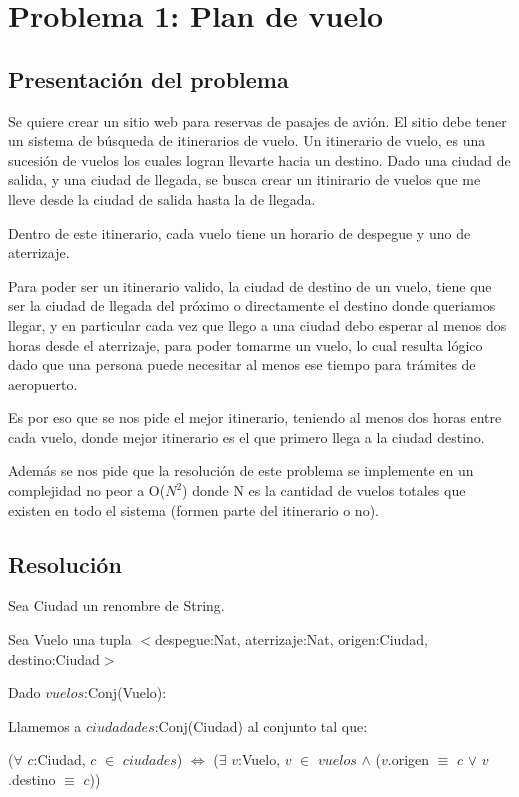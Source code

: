 \section{Problema 1: Plan de vuelo}

\subsection{Presentación del problema}

Se quiere crear un sitio web para reservas de pasajes de avi\'on. El sitio debe tener un sistema de b\'usqueda de itinerarios de vuelo. Un itinerario de vuelo, es una sucesi\'on de vuelos los cuales logran llevarte hacia un destino. Dado una ciudad de salida, y una ciudad de llegada, se busca crear un itinirario de vuelos que me lleve desde la ciudad de salida hasta la de llegada.

Dentro de este itinerario, cada vuelo tiene un horario de despegue y uno de aterrizaje. 

Para poder ser un itinerario valido, la ciudad de destino de un vuelo, tiene que ser la ciudad de llegada del pr\'oximo o directamente el destino donde queriamos llegar, y en particular cada vez que llego a una ciudad debo esperar al menos dos horas desde el aterrizaje, para poder tomarme un vuelo, lo cual resulta l\'ogico dado que una persona puede necesitar al menos ese tiempo para tr\'amites de aeropuerto.

Es por eso que se nos pide el mejor itinerario, teniendo al menos dos horas entre cada vuelo, donde mejor itinerario es el que primero llega a la ciudad destino.

Adem\'as se nos pide que la resoluci\'on de este problema se implemente en un complejidad no peor a O($N^{2}$) donde N es la cantidad de vuelos totales que existen en todo el sistema (formen parte del itinerario o no).
\subsection{Resolución}

Sea Ciudad un renombre de String.

Sea Vuelo una tupla $<$despegue:Nat, aterrizaje:Nat, origen:Ciudad, destino:Ciudad$>$

Dado $vuelos$:Conj(Vuelo):

Llamemos a $ciudadades$:Conj(Ciudad) al conjunto tal que:

($\forall$ $c$:Ciudad, $c$ $\in$ $ciudades$)  $\Leftrightarrow$ ($\exists$ $v$:Vuelo, $v$ $\in$ $vuelos$ $\wedge$ ($v$.origen $\equiv$ $c$ $\vee$ $v$.destino $\equiv$ $c$))


